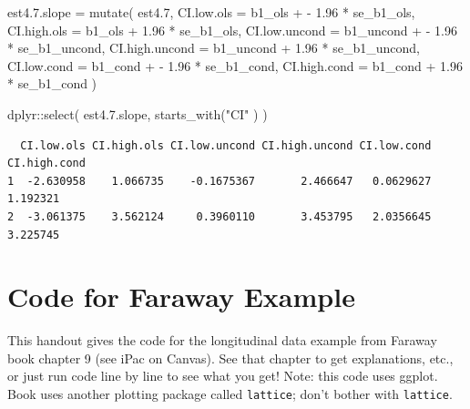 \documentclass[
  letterpaper,
  DIV=11,
  numbers=noendperiod]{scrreprt}
\newenvironment{Shaded}{\begin{snugshade}}{\end{snugshade}}
\newcommand{\AttributeTok}[1]{\textcolor[rgb]{0.49,0.56,0.16}{#1}}
\newcommand{\FloatTok}[1]{\textcolor[rgb]{0.25,0.63,0.44}{#1}}
\newcommand{\FunctionTok}[1]{\textcolor[rgb]{0.02,0.16,0.49}{#1}}
\newcommand{\NormalTok}[1]{\textcolor[rgb]{0.00,0.44,0.13}{#1}}
\newcommand{\OtherTok}[1]{\textcolor[rgb]{0.00,0.44,0.13}{#1}}
\newcommand{\SpecialCharTok}[1]{\textcolor[rgb]{0.25,0.44,0.63}{#1}}
\newcommand{\StringTok}[1]{\textcolor[rgb]{0.25,0.44,0.63}{#1}}
\begin{document}
\begin{Shaded}
\begin{Highlighting}[]
\NormalTok{est4.}\FloatTok{7.}\NormalTok{slope }\OtherTok{=} \FunctionTok{mutate}\NormalTok{( est4}\FloatTok{.7}\NormalTok{, }
                     \AttributeTok{CI.low.ols =}\NormalTok{ b1\_ols }\SpecialCharTok{+} \SpecialCharTok{{-}} \FloatTok{1.96} \SpecialCharTok{*}\NormalTok{ se\_b1\_ols,}
                     \AttributeTok{CI.high.ols =}\NormalTok{ b1\_ols }\SpecialCharTok{+} \FloatTok{1.96} \SpecialCharTok{*}\NormalTok{ se\_b1\_ols,}
                     \AttributeTok{CI.low.uncond =}\NormalTok{ b1\_uncond }\SpecialCharTok{+} \SpecialCharTok{{-}} \FloatTok{1.96} \SpecialCharTok{*}\NormalTok{ se\_b1\_uncond,}
                     \AttributeTok{CI.high.uncond =}\NormalTok{ b1\_uncond }\SpecialCharTok{+} \FloatTok{1.96} \SpecialCharTok{*}\NormalTok{ se\_b1\_uncond,}
                     \AttributeTok{CI.low.cond =}\NormalTok{ b1\_cond }\SpecialCharTok{+} \SpecialCharTok{{-}} \FloatTok{1.96} \SpecialCharTok{*}\NormalTok{ se\_b1\_cond,}
                     \AttributeTok{CI.high.cond =}\NormalTok{ b1\_cond }\SpecialCharTok{+} \FloatTok{1.96} \SpecialCharTok{*}\NormalTok{ se\_b1\_cond )}

\NormalTok{dplyr}\SpecialCharTok{::}\FunctionTok{select}\NormalTok{( est4.}\FloatTok{7.}\NormalTok{slope, }\FunctionTok{starts\_with}\NormalTok{(}\StringTok{"CI"}\NormalTok{ ) )}
\end{Highlighting}
\end{Shaded}

\begin{verbatim}
  CI.low.ols CI.high.ols CI.low.uncond CI.high.uncond CI.low.cond CI.high.cond
1  -2.630958    1.066735    -0.1675367       2.466647   0.0629627     1.192321
2  -3.061375    3.562124     0.3960110       3.453795   2.0356645     3.225745
\end{verbatim}

\hypertarget{code-for-faraway-example}{%
\chapter{Code for Faraway Example}\label{code-for-faraway-example}}

This handout gives the code for the longitudinal data example from
Faraway book chapter 9 (see iPac on Canvas). See that chapter to get
explanations, etc., or just run code line by line to see what you get!
Note: this code uses ggplot. Book uses another plotting package called
\texttt{lattice}; don't bother with \texttt{lattice}.
\end{document}
